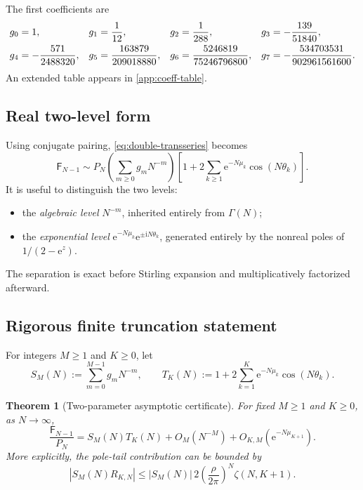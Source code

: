 \documentclass[11pt,oneside]{article}
\numberwithin{equation}{section}
\newtheorem{theorem}{Theorem}[section]
\newcommand{\e}{\mathrm e}
\newcommand{\ii}{\mathrm i}
\newcommand{\Fub}{\mathsf F}
\newcommand{\abs}[1]{\left|#1\right|}
\newcommand{\paren}[1]{\left(#1\right)}
\begin{document}
The first coefficients are
\begin{align}
 g_0&=1,
 &g_1&=\frac1{12},
 &g_2&=\frac1{288},
 &g_3&=-\frac{139}{51840},
 \notag\\
 g_4&=-\frac{571}{2488320},
 &g_5&=\frac{163879}{209018880},
 &g_6&=\frac{5246819}{75246796800},
 &g_7&=-\frac{534703531}{902961561600}.
 \label{eq:first-stirling-coeffs}
\end{align}
An extended table appears in \cref{app:coeff-table}.

\subsection{Real two-level form}

Using conjugate pairing, \cref{eq:double-transseries} becomes
\begin{equation}
 \Fub_{N-1}\sim P_N
 \left(\sum_{m\ge0}g_mN^{-m}\right)
 \left[1+2\sum_{k\ge1}\e^{-N\mu_k}\cos(N\theta_k)\right].
 \label{eq:real-double-transseries}
\end{equation}
It is useful to distinguish the two levels:
\begin{itemize}
 \item the \emph{algebraic level} \(N^{-m}\), inherited entirely from \(\Gamma(N)\);
 \item the \emph{exponential level} \(\e^{-N\mu_k}\e^{\pm\ii N\theta_k}\), generated entirely by the nonreal poles of \(1/(2-\e^z)\).
\end{itemize}
The separation is exact before Stirling expansion and multiplicatively factorized afterward.

\subsection{Rigorous finite truncation statement}

For integers \(M\ge1\) and \(K\ge0\), let
\begin{equation}
 S_M(N):=\sum_{m=0}^{M-1}g_mN^{-m},
 \qquad
 T_K(N):=1+2\sum_{k=1}^{K}\e^{-N\mu_k}\cos(N\theta_k).
 \label{eq:finite-truncations}
\end{equation}

\begin{theorem}[Two-parameter asymptotic certificate]
\label{thm:two-parameter-certificate}
For fixed \(M\ge1\) and \(K\ge0\), as \(N\to\infty\),
\begin{equation}
 \frac{\Fub_{N-1}}{P_N}
 =S_M(N)T_K(N)
 +O_M(N^{-M})
 +O_{K,M}(\e^{-N\mu_{K+1}}).
 \label{eq:two-parameter-certificate}
\end{equation}
More explicitly, the pole-tail contribution can be bounded by
\begin{equation}
 \abs{S_M(N)R_{K,N}}
 \le \abs{S_M(N)}\,
 2\paren{\frac{\rho}{2\pi}}^N\zeta(N,K+1).
 \label{eq:explicit-composite-bound}
\end{equation}
\end{theorem}
\end{document}
